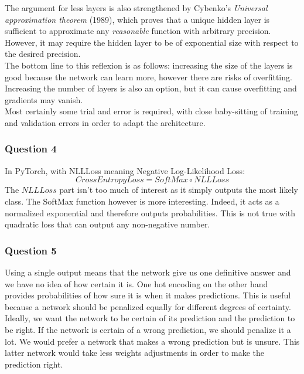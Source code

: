 \documentclass[12pt]{article}
\begin{document}
The argument for less layers is also strengthened by Cybenko's \textit{Universal approximation theorem} (1989), which proves that a unique hidden layer is sufficient to approximate any \textit{reasonable} function with arbitrary precision.
However, it may require the hidden layer to be of exponential size with respect to the desired precision. \\
The bottom line to this reflexion is as follows: increasing the size of the layers is good because the network can learn more, however there are risks of overfitting.
Increasing the number of layers is also an option, but it can cause overfitting and gradients may vanish. \\
Most certainly some trial and error is required, with close baby-sitting of training and validation errors in order to adapt the architecture.


\subsubsection{Question 4}
In PyTorch, with NLLLoss meaning Negative Log-Likelihood Loss:
\begin{equation}
  CrossEntropyLoss = SoftMax \circ NLLLoss
\end{equation}
The $NLLLoss$ part isn't too much of interest as it simply outputs the most likely class. The SoftMax function however is more interesting. Indeed, it acts as a normalized exponential and therefore outputs probabilities. This is not true with quadratic loss that can output any non-negative number.


\subsubsection{Question 5}
Using a single output means that the network give us one definitive answer and we have no idea of how certain it is.
One hot encoding on the other hand provides probabilities of how sure it is when it makes predictions.
This is useful because a network should be penalized equally for different degrees of certainty.
Ideally, we want the network to be certain of its prediction and the prediction to be right.
If the network is certain of a wrong prediction, we should penalize it a lot.
We would prefer a network that makes a wrong prediction but is unsure.
This latter network would take less weights adjustments in order to make the prediction right.
\end{document}
